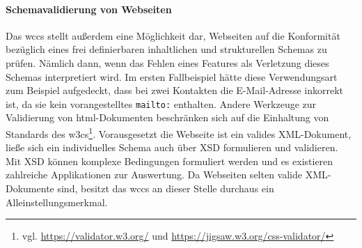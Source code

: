         \paragraph*{Schemavalidierung von Webseiten}
        Das \gls{wccs} stellt außerdem eine Möglichkeit dar,
        Webseiten auf die Konformität bezüglich eines frei definierbaren
        inhaltlichen und strukturellen Schemas zu prüfen.
        Nämlich dann, wenn das Fehlen eines Features als Verletzung
        dieses Schemas interpretiert wird.
        Im ersten Fallbeispiel hätte diese Verwendungsart zum Beispiel aufgedeckt,
        dass bei zwei Kontakten die E-Mail-Adresse inkorrekt ist,
        da sie kein vorangestelltes \texttt{mailto:} enthalten.
        Andere Werkzeuge zur Validierung von \gls{html}-Dokumenten
        beschränken sich auf die Einhaltung von Standards des
        \glspl{w3c}\footnote{vgl. \url{https://validator.w3.org/} und \url{https://jigsaw.w3.org/css-validator/}}.
        Vorausgesetzt die Webseite ist ein valides XML-Dokument,
        ließe sich ein individuelles Schema auch über XSD formulieren und validieren.
        Mit XSD können komplexe Bedingungen formuliert werden und es existieren
        zahlreiche Applikationen zur Auswertung.
        Da Webseiten selten valide XML-Dokumente sind,
        besitzt das \gls{wccs} an dieser Stelle durchaus
        ein Alleinstellungsmerkmal.
